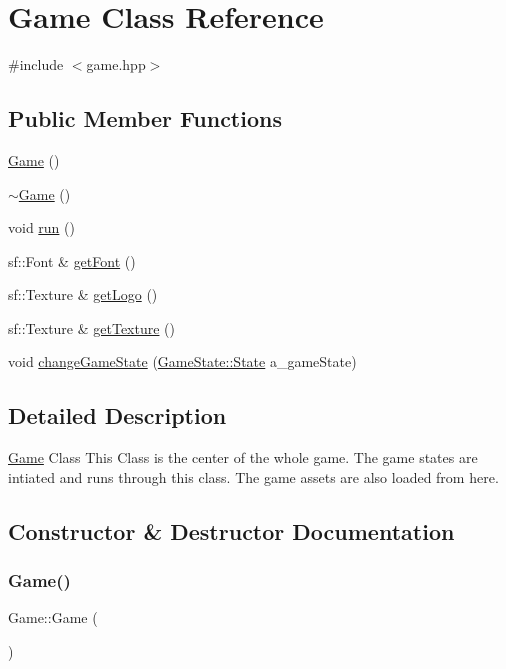 \hypertarget{class_game}{}\section{Game Class Reference}
\label{class_game}


{\ttfamily \#include $<$game.\+hpp$>$}

\subsection*{Public Member Functions}
\begin{DoxyCompactItemize}
\item 
\hyperlink{class_game_ad59df6562a58a614fda24622d3715b65}{Game} ()
\item 
\hyperlink{class_game_ae3d112ca6e0e55150d2fdbc704474530}{$\sim$\+Game} ()
\item 
void \hyperlink{class_game_a1ab78f5ed0d5ea879157357cf2fb2afa}{run} ()
\item 
sf\+::\+Font \& \hyperlink{class_game_a813ff20fa498389e4bb120090803676b}{get\+Font} ()
\item 
sf\+::\+Texture \& \hyperlink{class_game_a4eb607b287a0aa0238339454399edc8b}{get\+Logo} ()
\item 
sf\+::\+Texture \& \hyperlink{class_game_aa231abe1d7a36b55599ca459c815b2a5}{get\+Texture} ()
\item 
void \hyperlink{class_game_aead31c173174cd4251542403a9e1e111}{change\+Game\+State} (\hyperlink{class_game_state_a81618e0403319d48e9f25347111f8157}{Game\+State\+::\+State} a\+\_\+game\+State)
\end{DoxyCompactItemize}


\subsection{Detailed Description}
\hyperlink{class_game}{Game} Class This Class is the center of the whole game. The game states are intiated and runs through this class. The game assets are also loaded from here. 

\subsection{Constructor \& Destructor Documentation}
\mbox{\label{class_game_ad59df6562a58a614fda24622d3715b65}} 
\subsubsection{\texorpdfstring{Game()}{Game()}}
{\footnotesize\ttfamily Game\+::\+Game (\begin{DoxyParamCaption}{ }\end{DoxyParamCaption})}

